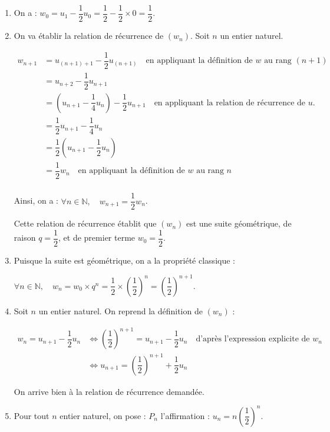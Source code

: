 \documentclass[10pt]{article}
\providecommand{\N}{\mathbb{N}}
\begin{document}
\begin{enumerate}
\item On a : \quad$w_{0} = u_1 - \dfrac{1}{2}u_0 = \dfrac{1}{2} - \dfrac{1}{2}\times 0 = \dfrac{1}{2}$.
\item On va établir la relation de récurrence de $(w_n)$. Soit $n$ un entier naturel.

$\begin{aligned}
	w_{n+1} &= u_{(n+1) + 1} - \dfrac{1}{2} u_{(n+1)} \quad \text{en appliquant la définition de $w$ au rang }(n+1)\\
	&= u_{n+2} - \dfrac{1}{2}u_{n+1}\\
	&=\left(u_{n+1} - \dfrac{1}{4}u_n\right)	- \dfrac{1}{2}u_{n+1}\quad\text{en appliquant la relation de récurrence de }u. \\
	&=\dfrac{1}{2}u_{n+1} - \dfrac{1}{4}u_n\\
	&=\dfrac{1}{2}\left(u_{n+1} - \dfrac{1}{2}u_n\right) \\
	&=\dfrac{1}{2}w_n\quad \text{en appliquant la définition de $w$ au rang }n\\
\end{aligned}$

Ainsi, on a : \quad $\forall n \in \N,\quad w_{n+1} = \dfrac{1}{2}w_n$.

Cette relation de récurrence établit que $(w_n)$ est une suite géométrique, de raison $q = \dfrac{1}{2}$, et de premier terme $w_0 = \dfrac{1}{2}$.

\item Puisque la suite est géométrique, on a la propriété classique :

$\forall n \in \N,\quad w_n = w_0 \times q^n = \dfrac{1}{2} \times \left(\dfrac{1}{2}\right)^n = \left(\dfrac{1}{2}\right)^{n+1}$.
\item Soit $n$ un entier naturel. On reprend la définition de $(w_n)$ :

$\begin{aligned}
	w_n = u_{n+1} - \dfrac{1}{2}u_n&\iff
	\left(\dfrac{1}{2}\right)^{n+1} = u_{n+1} - \dfrac{1}{2}u_n\quad \text{d'après l'expression explicite de }w_n\\
	&\iff u_{n+1}=\left(\dfrac{1}{2}\right)^{n+1}+\dfrac{1}{2} u_{n}
\end{aligned}$

On arrive bien à la relation de récurrence demandée.

\item Pour tout $n$ entier naturel, on pose : $P_n$ l'affirmation : \og $u_n = n\left(\dfrac{1}{2}\right)^{n}$\fg{}.


\end{enumerate}
\end{document}

